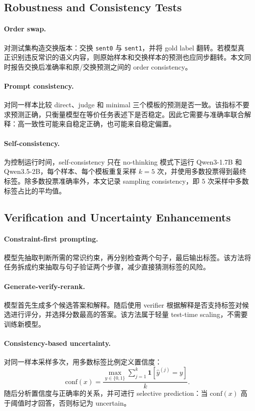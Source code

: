 \subsection{Robustness and Consistency Tests}

\paragraph{Order swap.}
对测试集构造交换版本：交换 \texttt{sent0} 与 \texttt{sent1}，并将 gold label 翻转。若模型真正识别违反常识的语义内容，则原始样本和交换样本的预测也应同步翻转。本文同时报告交换后准确率和原/交换预测之间的 order consistency。

\paragraph{Prompt consistency.}
对同一样本比较 direct、judge 和 minimal 三个模板的预测是否一致。该指标不要求预测正确，只衡量模型在等价任务表述下是否稳定。因此它需要与准确率联合解释：高一致性可能来自稳定正确，也可能来自稳定偏置。

\paragraph{Self-consistency.}
为控制运行时间，self-consistency 只在 no-thinking 模式下运行 Qwen3-1.7B 和 Qwen3.5-2B，每个样本、每个模板重复采样 \(k=5\) 次，并使用多数投票得到最终标签。除多数投票准确率外，本文记录 sampling consistency，即 5 次采样中多数标签占比的平均值。

\subsection{Verification and Uncertainty Enhancements}

\paragraph{Constraint-first prompting.}
模型先抽取判断所需的常识约束，再分别检查两个句子，最后输出标签。该方法将任务拆成约束抽取与句子验证两个步骤，减少直接猜测标签的风险。

\paragraph{Generate-verify-rerank.}
模型首先生成多个候选答案和解释。随后使用 verifier 根据解释是否支持标签对候选进行评分，并选择分数最高的答案。该方法属于轻量 test-time scaling，不需要训练新模型。

\paragraph{Consistency-based uncertainty.}
对同一样本采样多次，用多数标签比例定义置信度：
\[
\mathrm{conf}(x)=\frac{\max_{y \in \{0,1\}}\sum_{j=1}^{k}\mathbf{1}[\hat{y}^{(j)}=y]}{k}.
\]
随后分析置信度与正确率的关系，并可进行 selective prediction：当 \(\mathrm{conf}(x)\) 高于阈值时才回答，否则标记为 uncertain。
